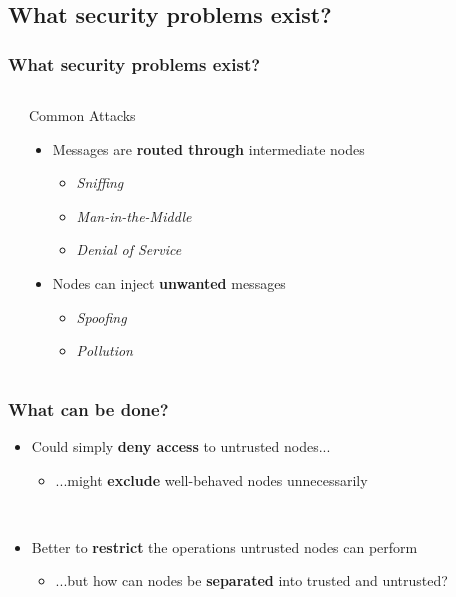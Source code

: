 \documentclass{beamer}
\begin{document}
\subsection{What security problems exist?}
\begin{frame}
  \frametitle{What security problems exist?}
  \begin{columns}
  \column{4.5cm}

  \begin{center}
  \end{center}

  \column{6cm}
  \begin{block}{Common Attacks}
    \begin{itemize}
    \item<1>{Messages are \textbf{routed through} intermediate nodes}
        \begin{itemize}
        \item{\it Sniffing}
        \item{\it Man-in-the-Middle}
        \item{\it Denial of Service}
        \end{itemize}
    \item<2>{Nodes can inject \textbf{unwanted} messages}
        \begin{itemize}
        \item{\it Spoofing}
        \item{\it Pollution}
        \end{itemize}
  \end{itemize}
  \end{block}
  \end{columns}
\end{frame}

\begin{frame}
  \frametitle{What can be done?}
  \begin{itemize}

  \item<1->{Could simply \textbf{deny access} to untrusted nodes...}
  \begin{itemize}
    \item{...might \textbf{exclude} well-behaved nodes unnecessarily}
  \end{itemize}
  ~\\ %
  \item<2>{Better to \textbf{restrict} the operations untrusted nodes can perform}
  \begin{itemize}
    \item{...but how can nodes be \textbf{separated} into trusted and untrusted?}
  \end{itemize}
  \end{itemize}

\end{frame}
\end{document}
